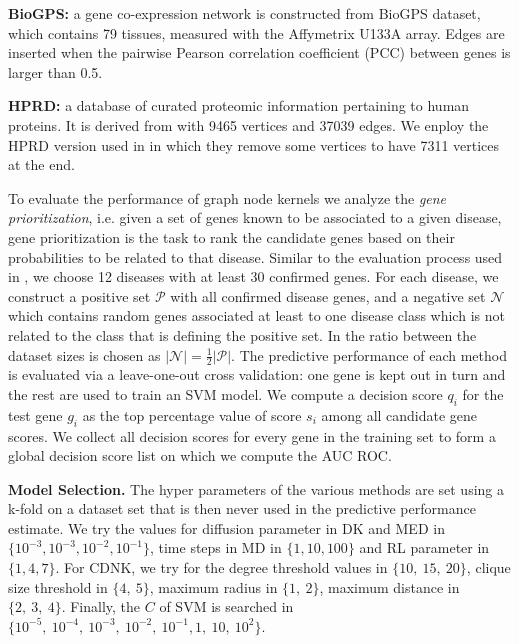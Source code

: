 \documentclass{article}
\begin{document}
\textbf{BioGPS:} a gene co-expression network is constructed from BioGPS dataset, which contains 79 tissues, measured with the Affymetrix U133A array. Edges are inserted when the pairwise Pearson correlation coefficient (PCC) between genes is larger than 0.5.

\textbf{HPRD:} a database of curated proteomic information pertaining to human proteins. It is derived from \cite{hprd} with 9465 vertices and 37039 edges. We enploy the HPRD version used in \cite{medk} in which they remove some vertices to have 7311 vertices at the end.

To evaluate the performance of graph node kernels we analyze the {\em gene prioritization}, i.e. given a set of genes known to be associated to a given disease, gene prioritization is the task to rank the candidate genes based on their probabilities to be related to that disease. Similar to the evaluation process used in \cite{medk}, we choose 12 diseases with at least 30 confirmed genes. For each disease, we construct a positive set $\mathcal{P}$ with all confirmed disease genes, and a negative set $\mathcal{N}$ which contains random genes associated at least to one disease class which is not related to the class that is defining the positive set. In \cite{medk} the ratio between the dataset sizes is chosen as $\vert \mathcal{N} \vert =
\frac{1}{2} \vert \mathcal{P} \vert$. The predictive performance of each method is evaluated via a leave-one-out cross validation: one gene is kept out in turn and the rest are used to train an SVM model. We compute a decision score $q_i$ for the test gene $g_i$ as the top percentage value of score $s_i$ among all candidate gene scores. We collect all decision scores for every gene in the training set to form a global decision score list on which we compute the AUC ROC.

\textbf{Model Selection.}
The hyper parameters of the various methods are set using a k-fold on a dataset set that is then never used in the predictive performance estimate. We try the values for diffusion parameter in DK and MED in $\lbrace 10^{-3}, 10^{-3}, 10^{-2}, 10^{-1} \rbrace$, time steps in MD in $\lbrace 1, 10, 100 \rbrace$ and RL parameter in $\lbrace 1, 4, 7 \rbrace$. For CDNK, we try for the degree threshold values in $\lbrace 10,\ 15,\ 20 \rbrace$, clique size threshold in $\lbrace 4,\ 5 \rbrace$, maximum radius in $\lbrace 1,\ 2 \rbrace$, maximum distance in $\lbrace 2,\ 3,\ 4 \rbrace$. Finally, the $C$ of SVM is searched in $\lbrace 10^{-5},  \ 10^{-4}, \ 10^{-3},\ 10^{-2},\ 10^{-1}, 1,\ 10,\ 10^2 \rbrace$.
\end{document}
